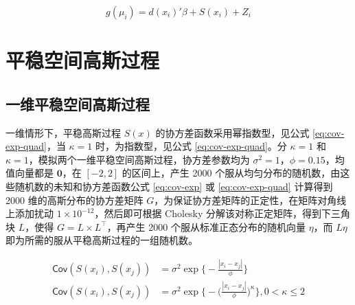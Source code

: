\documentclass[12pt,a4paper,UTF8,twoside]{book}
\theoremstyle{definition}
\theoremstyle{definition}
\theoremstyle{definition}
\theoremstyle{remark}
\begin{document}
\begin{equation}
g(\mu_i) = d(x_i)'\beta + S(x_i) + Z_i \label{eq:sim-sglmm}
\end{equation}

\hypertarget{spatial-gaussian-processes}{%
\section{平稳空间高斯过程}\label{spatial-gaussian-processes}}

\hypertarget{sim-one-gp}{%
\subsection{一维平稳空间高斯过程}\label{sim-one-gp}}

一维情形下，平稳高斯过程 \(S(x)\) 的协方差函数采用幂指数型，见公式
\eqref{eq:cov-exp-quad}，当 \(\kappa =1\) 时，为指数型，见公式
\eqref{eq:cov-exp-quad}。分 \(\kappa =1\) 和
\(\kappa =1\)，模拟两个一维平稳空间高斯过程，协方差参数均为
\(\sigma^2 = 1\)，\(\phi = 0.15\)，均值向量都是 \(\mathbf{0}\)，在
\([-2,2]\) 的区间上，产生 2000
个服从均匀分布的随机数，由这些随机数的未知和协方差函数公式
\eqref{eq:cov-exp} 或 \eqref{eq:cov-exp-quad} 计算得到 2000
维的高斯分布的协方差矩阵
\(G\)，为保证协方差矩阵的正定性，在矩阵对角线上添加扰动
\(1 \times 10^{-12}\)，然后即可根据 Cholesky
分解该对称正定矩阵，得到下三角块 \(L\)，使得
\(G = L \times L^{\top}\)，再产生 2000 个服从标准正态分布的随机向量
\(\eta\)，而 \(L\eta\) 即为所需的服从平稳高斯过程的一组随机数。

\begin{align}
\mathsf{Cov}(S(x_i), S(x_j)) & = \sigma^2 \exp\big\{ - \frac{|x_{i} - x_{j}|}{ \phi } \big\}  \label{eq:cov-exp} \\
\mathsf{Cov}(S(x_i), S(x_j)) & = \sigma^2 \exp\big\{ -\big( \frac{ |x_{i} - x_{j}| }{ \phi } \big) ^ {\kappa} \big\}, 0 < \kappa \leq 2  \label{eq:cov-exp-quad} 
\end{align}
\end{document}
